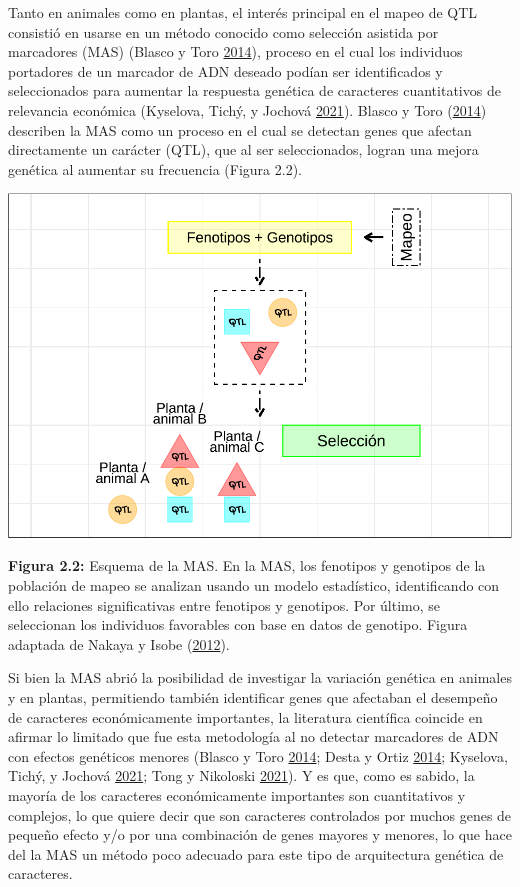 \documentclass[11pt,spanish,a4paper,oneside,]{book} %
\begin{document}
Tanto en animales como en plantas, el interés principal en el mapeo de QTL consistió en usarse en un método conocido como selección asistida por marcadores (MAS) (Blasco y Toro \protect\hyperlink{ref-cite:3}{2014}), proceso en el cual los individuos portadores de un marcador de ADN deseado podían ser identificados y seleccionados para aumentar la respuesta genética de caracteres cuantitativos de relevancia económica (Kyselova, Tichý, y Jochová \protect\hyperlink{ref-cite:32}{2021}). Blasco y Toro (\protect\hyperlink{ref-cite:3}{2014}) describen la MAS como un proceso en el cual se detectan genes que afectan directamente un carácter (QTL), que al ser seleccionados, logran una mejora genética al aumentar su frecuencia (Figura 2.2).

\begin{center}\includegraphics[width=1\linewidth]{figures/MAS} \end{center}

\begin{center}
\textbf{Figura 2.2:} Esquema de la MAS. En la MAS, los fenotipos y genotipos de la población de mapeo se analizan usando un modelo estadístico, identificando con ello relaciones significativas entre fenotipos y genotipos. Por último, se seleccionan los individuos favorables con base en datos de genotipo. Figura adaptada de Nakaya y Isobe (\protect\hyperlink{ref-cite:6}{2012}).

\end{center}

Si bien la MAS abrió la posibilidad de investigar la variación genética en animales y en plantas, permitiendo también identificar genes que afectaban el desempeño de caracteres económicamente importantes, la literatura científica coincide en afirmar lo limitado que fue esta metodología al no detectar marcadores de ADN con efectos genéticos menores (Blasco y Toro \protect\hyperlink{ref-cite:3}{2014}; Desta y Ortiz \protect\hyperlink{ref-cite:10}{2014}; Kyselova, Tichý, y Jochová \protect\hyperlink{ref-cite:32}{2021}; Tong y Nikoloski \protect\hyperlink{ref-cite:7}{2021}). Y es que, como es sabido, la mayoría de los caracteres económicamente importantes son cuantitativos y complejos, lo que quiere decir que son caracteres controlados por muchos genes de pequeño efecto y/o por una combinación de genes mayores y menores, lo que hace del la MAS un método poco adecuado para este tipo de arquitectura genética de caracteres.
\end{document}
